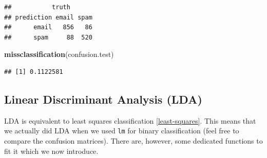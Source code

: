 \documentclass[]{book}
\newenvironment{Shaded}{\begin{snugshade}}{\end{snugshade}}
\newcommand{\CommentTok}[1]{\textcolor[rgb]{0.56,0.35,0.01}{\textit{#1}}}
\newcommand{\DataTypeTok}[1]{\textcolor[rgb]{0.13,0.29,0.53}{#1}}
\newcommand{\DecValTok}[1]{\textcolor[rgb]{0.00,0.00,0.81}{#1}}
\newcommand{\FloatTok}[1]{\textcolor[rgb]{0.00,0.00,0.81}{#1}}
\newcommand{\KeywordTok}[1]{\textcolor[rgb]{0.13,0.29,0.53}{\textbf{#1}}}
\newcommand{\NormalTok}[1]{#1}
\newcommand{\OperatorTok}[1]{\textcolor[rgb]{0.81,0.36,0.00}{\textbf{#1}}}
\newcommand{\StringTok}[1]{\textcolor[rgb]{0.31,0.60,0.02}{#1}}
\theoremstyle{definition}
\theoremstyle{definition}
\theoremstyle{definition}
\theoremstyle{remark}
\begin{document}
\begin{Shaded}
\end{Shaded}

\begin{verbatim}
##           truth
## prediction email spam
##      email   856   86
##      spam     88  520
\end{verbatim}

\begin{Shaded}
\begin{Highlighting}[]
\KeywordTok{missclassification}\NormalTok{(confusion.test)}
\end{Highlighting}
\end{Shaded}

\begin{verbatim}
## [1] 0.1122581
\end{verbatim}

\hypertarget{linear-discriminant-analysis-lda}{%
\subsection{Linear Discriminant Analysis (LDA)}\label{linear-discriminant-analysis-lda}}

LDA is equivalent to least squares classification \ref{least-squares}.
This means that we actually did LDA when we used \texttt{lm} for binary classification (feel free to compare the confusion matrices).
There are, however, some dedicated functions to fit it which we now introduce.

\begin{Shaded}
\end{Shaded}
\end{document}
